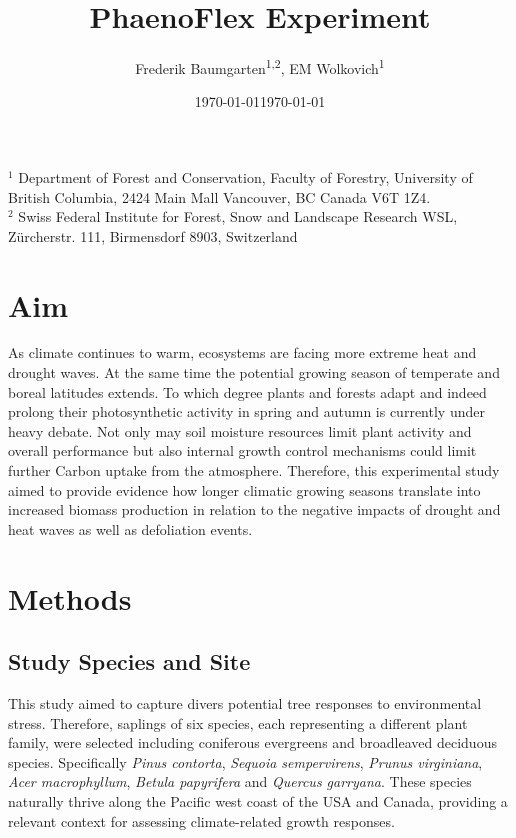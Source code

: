 \documentclass{article}
\begin{document}
	
	
	\title{PhaenoFlex Experiment %
} 

\date{\today}
\author{Frederik Baumgarten\textsuperscript{1,2}, EM Wolkovich\textsuperscript{1}}
\maketitle

$^1$ Department of Forest and Conservation, Faculty of Forestry, University of British Columbia, 2424 Main Mall
Vancouver, BC Canada V6T 1Z4. \\

$^2$  Swiss Federal Institute for Forest, Snow and Landscape Research WSL, Zürcherstr. 111, Birmensdorf 8903, Switzerland\\

	
	
	\date{\today}
	
	\section*{Aim}
	As climate continues to warm, ecosystems are facing more extreme heat and drought waves. At the same time the potential growing season of temperate and boreal latitudes extends. To which degree plants and forests adapt and indeed prolong their photosynthetic activity in spring and autumn is currently under heavy debate. Not only may soil moisture resources limit plant activity and overall performance but also internal growth control mechanisms could limit further Carbon uptake from the atmosphere. Therefore, this experimental study aimed to provide evidence how longer climatic growing seasons translate into increased biomass production in relation to the negative impacts of drought and heat waves as well as defoliation events. 
	
		\newpage
	\section*{Methods}
	
	\subsection*{Study Species and Site}
	
	This study aimed to capture divers potential tree responses to environmental stress. Therefore, saplings of six species, each representing a different plant family, were selected including coniferous evergreens and broadleaved deciduous species. Specifically \textit{Pinus contorta}, \textit{Sequoia sempervirens}, \textit{Prunus virginiana}, \textit{Acer macrophyllum}, \textit{Betula papyrifera} and \textit{Quercus garryana}. These species naturally thrive along the Pacific west coast of the USA and Canada, providing a relevant context for assessing climate-related growth responses.\\
	
\end{document}
